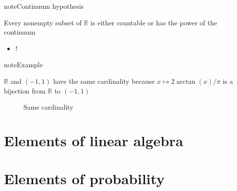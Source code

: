 \documentclass[letterpaper,10pt,english]{jupyterBook}
\begin{document}
\begin{sphinxadmonition}{note}{Continuum hypothesis}

\sphinxAtStartPar
Every nonempty subset of \(\mathbb{R}\) is either
countable or has the power of the continuum
\end{sphinxadmonition}
\begin{itemize}
\item {} 
\sphinxAtStartPar
{}!

\end{itemize}

\begin{sphinxadmonition}{note}{Example}

\sphinxAtStartPar
\(\mathbb{R}\) and \((-1, 1)\) have the same cardinality because \(x \mapsto 2\arctan(x)/\pi\) is a bijection from \(\mathbb{R}\) to \((-1, 1)\)
\end{sphinxadmonition}

\begin{figure}[htbp]
\centering
\capstart

\noindent{}
\caption{Same cardinality}\label{\detokenize{03.set_theory:arctan}}\end{figure}

\sphinxAtStartPar
{}

\sphinxstepscope


\chapter{Elements of linear algebra}
\label{\detokenize{04.linear_algebra:elements-of-linear-algebra}}\label{\detokenize{04.linear_algebra::doc}}



\sphinxstepscope


\chapter{Elements of probability}
\label{\detokenize{05.probability:elements-of-probability}}\label{\detokenize{05.probability::doc}}
\end{document}

